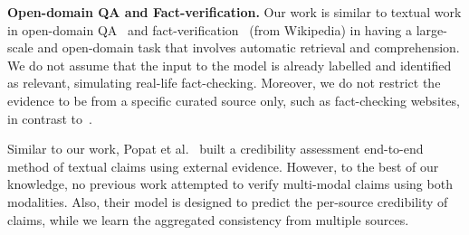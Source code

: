 \textbf{Open-domain QA and Fact-verification.}
Our work is similar to textual work in open-domain QA~\cite{chen2017reading} and fact-verification~\cite{thorne2018fever} (from Wikipedia) in having a large-scale and open-domain task that involves automatic retrieval and comprehension. We do not assume that the input to the model is already labelled and identified as relevant, simulating real-life fact-checking. Moreover, we do not restrict the evidence to be from a specific curated source only, such as fact-checking websites, in contrast to~\cite{vo2020facts}. 

Similar to our work, Popat et al.~\cite{popat2018declare} built a credibility assessment end-to-end method of textual claims using external evidence. However, to the best of our knowledge, no previous work attempted to verify multi-modal claims using both modalities. Also, their model is designed to predict the per-source credibility of claims, while we learn the aggregated consistency from multiple sources. 

